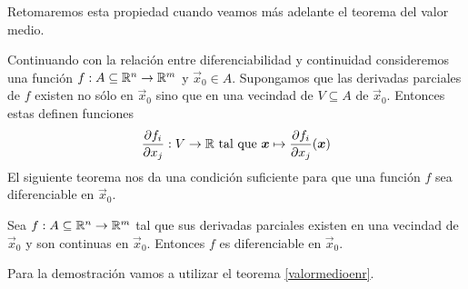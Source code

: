 Retomaremos esta propiedad cuando veamos m\'as adelante el teorema del valor medio.

Continuando con la relaci\'on entre diferenciabilidad y continuidad
consideremos una funci\'on $f:A\subseteq\mathbb{R}^n\to\mathbb{R}^m$ y $\vec{x}_0\in A$. 
Supongamos que las derivadas parciales de $f$ existen no s\'olo en $\vec{x}_0$ 
sino que en una vecindad de $V\subseteq A$ de $\vec{x}_0$. 
Entonces estas definen funciones
$$\frac{\partial f_i}{\partial x_j}:V\to \mathbb{R} \text{ tal que } \boldsymbol{x}\mapsto \frac{\partial f_i}{\partial x_j}(\boldsymbol{x})$$
El siguiente teorema nos da una condici\'on suficiente para 
que una funci\'on $f$ sea diferenciable en $\vec{x}_0$.

\begin{teorema}\label{teoremaderivadas}
Sea $f:A\subseteq\mathbb{R}^n\to\mathbb{R}^m$ tal que sus derivadas parciales existen en una vecindad de $\vec{x}_0$ y son continuas en $\vec{x}_0$. Entonces $f$ es diferenciable en $\vec{x}_0$.
\end{teorema}

Para la demostraci\'on vamos a utilizar el teorema \ref{valormedioenr}.

